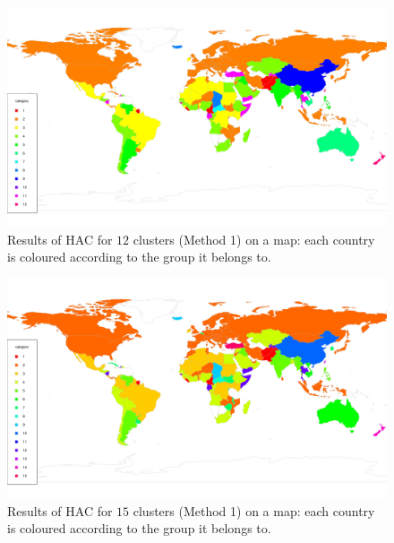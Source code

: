\documentclass[a4paper,12pt]{article}
\numberwithin{equation}{section}
\begin{document}
\begin{figure}[t!]
\begin{minipage}[t]{0.98\textwidth}
\includegraphics[width=\textwidth]{plots/choropleth_12}
\caption{Results of HAC for $12$ clusters (Method 1) on a map: each country is coloured according to the group it belongs to.}
\end{minipage}
\end{figure}


\newpage 
\FloatBarrier
\begin{figure}[t!]
\begin{minipage}[t]{0.98\textwidth}
\includegraphics[width=\textwidth]{plots/choropleth_15}
\caption{Results of HAC for $15$ clusters (Method 1) on a map: each country is coloured according to the group it belongs to.}\label{fig:map_15cl}
\end{minipage}
\end{figure}
\end{document}
